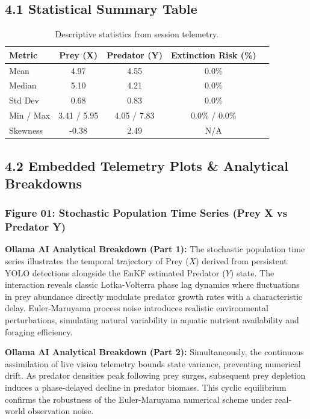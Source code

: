\documentclass[11pt,a4paper]{article}
\begin{document}
\subsection*{4.1 Statistical Summary Table}
\begin{table}[h!]
\centering
\begin{tabular}{lcccc}
\toprule
\textbf{Metric} & \textbf{Prey (X)} & \textbf{Predator (Y)} & \textbf{Extinction Risk (\%)} \\
\midrule
Mean & 4.97 & 4.55 & 0.0\% \\
Median & 5.10 & 4.21 & 0.0\% \\
Std Dev & 0.68 & 0.83 & 0.0\% \\
Min / Max & 3.41 / 5.95 & 4.05 / 7.83 & 0.0\% / 0.0\% \\
Skewness & -0.38 & 2.49 & N/A \\

\bottomrule
\end{tabular}
\caption{Descriptive statistics from session telemetry.}
\end{table}

\subsection*{4.2 Embedded Telemetry Plots \& Analytical Breakdowns}
\subsubsection*{Figure 01: Stochastic Population Time Series (Prey X vs Predator Y)}
\textbf{Ollama AI Analytical Breakdown (Part 1):} The stochastic population time series illustrates the temporal trajectory of Prey ($X$) derived from persistent YOLO detections alongside the EnKF estimated Predator ($Y$) state. The interaction reveals classic Lotka-Volterra phase lag dynamics where fluctuations in prey abundance directly modulate predator growth rates with a characteristic delay. Euler-Maruyama process noise introduces realistic environmental perturbations, simulating natural variability in aquatic nutrient availability and foraging efficiency.

\textbf{Ollama AI Analytical Breakdown (Part 2):} Simultaneously, the continuous assimilation of live vision telemetry bounds state variance, preventing numerical drift. As predator densities peak following prey surges, subsequent prey depletion induces a phase-delayed decline in predator biomass. This cyclic equilibrium confirms the robustness of the Euler-Maruyama numerical scheme under real-world observation noise.
\end{document}
